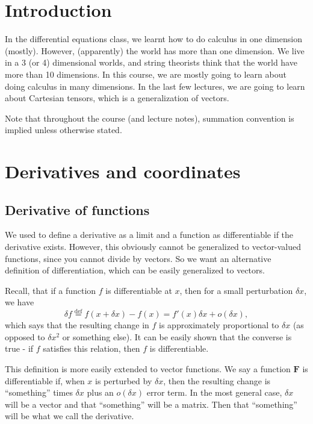 \documentclass[a4paper]{article}
\begin{document}
\tableofcontents

\setcounter{section}{-1}
\section{Introduction}
In the differential equations class, we learnt how to do calculus in one dimension (mostly). However, (apparently) the world has more than one dimension. We live in a 3 (or 4) dimensional worlds, and string theorists think that the world have more than 10 dimensions. In this course, we are mostly going to learn about doing calculus in many dimensions. In the last few lectures, we are going to learn about Cartesian tensors, which is a generalization of vectors.

Note that throughout the course (and lecture notes), summation convention is implied unless otherwise stated.

\section{Derivatives and coordinates}
\subsection{Derivative of functions}
We used to define a derivative as a limit and a function as differentiable if the derivative exists. However, this obviously cannot be generalized to vector-valued functions, since you cannot divide by vectors. So we want an alternative definition of differentiation, which can be easily generalized to vectors.

Recall, that if a function $f$ is differentiable at $x$, then for a small perturbation $\delta x$, we have
\[
  \delta f \stackrel{\text{def}}{=} f(x + \delta x) - f(x) = f'(x) \delta x + o(\delta x),
\]
which says that the resulting change in $f$ is approximately proportional to $\delta x$ (as opposed to $\delta x^2$ or something else). It can be easily shown that the converse is true - if $f$ satisfies this relation, then $f$ is differentiable.

This definition is more easily extended to vector functions. We say a function $\mathbf{F}$ is differentiable if, when $x$ is perturbed by $\delta x$, then the resulting change is ``something'' times $\delta x$ plus an $o(\delta x)$ error term. In the most general case, $\delta x$ will be a vector and that ``something'' will be a matrix. Then that ``something'' will be what we call the derivative.
\end{document}
